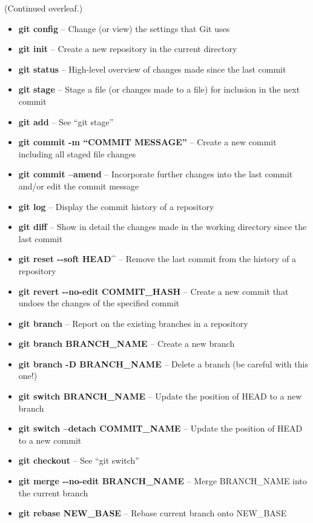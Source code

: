 \documentclass[9pt]{extarticle}
\def\itempad{-1pt}
\begin{document}
(Continued overleaf.)

\begin{bluebox}[title=Git Command Cheat Sheet]
  \begin{itemize}
    \itemsep\itempad
  \item \textbf{git config} -- Change (or view) the settings that Git uses
  \item \textbf{git init} -- Create a new repository in the current directory
  \item \textbf{git status} -- High-level overview of changes made since the last commit
  \item \textbf{git stage} -- Stage a file (or changes made to a file) for inclusion in
    the next commit
  \item \textbf{git add} -- See ``git stage''
  \item \textbf{git commit -m ``COMMIT MESSAGE''} -- Create a new commit including all
    staged file changes
  \item \textbf{git commit --amend} -- Incorporate further changes into the last commit
    and/or edit the commit message
  \item \textbf{git log} -- Display the commit history of a repository
  \item \textbf{git diff} -- Show in detail the changes made in the working directory
    since the last commit
  \item \textbf{git reset -{}-soft HEAD\^} -- Remove the last commit from the history of
    a repository
  \item \textbf{git revert -{}-no-edit COMMIT\_HASH} -- Create a new commit that undoes
    the changes of the specified commit
  \item \textbf{git branch} -- Report on the existing branches in a repository
  \item \textbf{git branch BRANCH\_NAME} -- Create a new branch
  \item \textbf{git branch -D BRANCH\_NAME} -- Delete a branch (be careful with this one!)
  \item \textbf{git switch BRANCH\_NAME} -- Update the position of HEAD to
    a new branch
  \item \textbf{git switch --detach COMMIT\_NAME} -- Update the position of HEAD to a
    new commit
  \item \textbf{git checkout} -- See ``git switch''
  \item \textbf{git merge -{}-no-edit BRANCH\_NAME} -- Merge BRANCH\_NAME into the
    current branch
  \item \textbf{git rebase NEW\_BASE} -- Rebase current branch onto NEW\_BASE

\end{itemize}
\end{bluebox}
\end{document}
